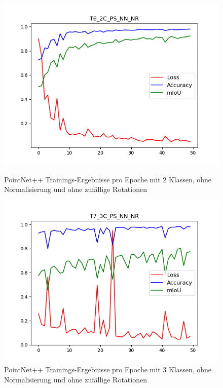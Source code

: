 \documentclass[12pt,titlepage, twoside]{article}
\begin{document}
\begin{figure}
    \centering
    \begin{minipage}{0.475\textwidth}
        \centering
        \includegraphics[width=1.0\textwidth]{./Images/T6_2C_PS_NN_NR.png}
        \caption{PointNet++ Trainings-Ergebnisse pro Epoche mit 2 Klassen, ohne Normalisierung und ohne zufällige Rotationen }
        \label{fig:T6_2C_PS_NN_NR}
    \end{minipage}\hfill
    \begin{minipage}{0.475\textwidth}
        \centering
        \includegraphics[width=1.0\textwidth]{./Images/T7_3C_PS_NN_NR.png}
        \caption{PointNet++ Trainings-Ergebnisse pro Epoche mit 3 Klassen, ohne Normalisierung und ohne zufällige Rotationen}
        \label{fig:T7_3C_PS_NN_NR}
    \end{minipage}
\end{figure}
\end{document}
